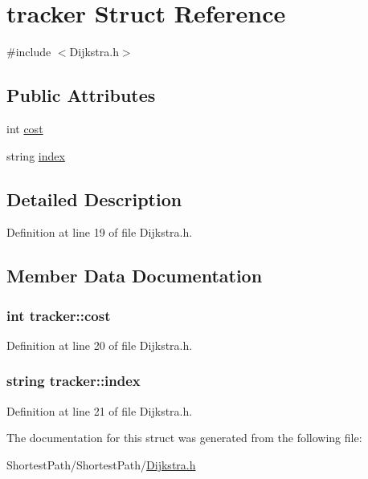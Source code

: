 \hypertarget{structtracker}{}\section{tracker Struct Reference}
\label{structtracker}


{\ttfamily \#include $<$Dijkstra.\+h$>$}

\subsection*{Public Attributes}
\begin{DoxyCompactItemize}
\item 
int \hyperlink{structtracker_a8843628a87d7614381f52a85f2fb4065}{cost}
\item 
string \hyperlink{structtracker_a9f6ba2c7cd0de65fb211b0fa4036125f}{index}
\end{DoxyCompactItemize}


\subsection{Detailed Description}


Definition at line 19 of file Dijkstra.\+h.



\subsection{Member Data Documentation}
\hypertarget{structtracker_a8843628a87d7614381f52a85f2fb4065}{}
\subsubsection[{cost}]{\setlength{\rightskip}{0pt plus 5cm}int tracker\+::cost}\label{structtracker_a8843628a87d7614381f52a85f2fb4065}


Definition at line 20 of file Dijkstra.\+h.

\hypertarget{structtracker_a9f6ba2c7cd0de65fb211b0fa4036125f}{}
\subsubsection[{index}]{\setlength{\rightskip}{0pt plus 5cm}string tracker\+::index}\label{structtracker_a9f6ba2c7cd0de65fb211b0fa4036125f}


Definition at line 21 of file Dijkstra.\+h.



The documentation for this struct was generated from the following file\+:\begin{DoxyCompactItemize}
\item 
Shortest\+Path/\+Shortest\+Path/\hyperlink{_dijkstra_8h}{Dijkstra.\+h}\end{DoxyCompactItemize}

